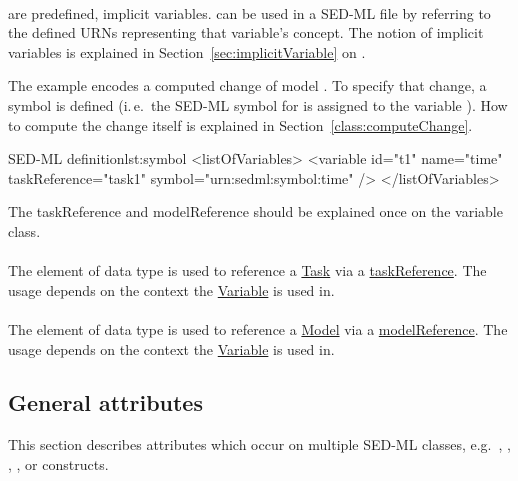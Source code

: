 \paragraph*{}
\label{sec:symbol}
 are predefined, implicit variables.  can be used in a SED-ML file by referring to the defined URNs representing that variable's concept. The notion of implicit variables is explained in Section~\ref{sec:implicitVariable} on .

The example encodes a computed change of model . To specify that change, a symbol is defined (i.\,e.\  the SED-ML symbol for  is assigned to the variable ). How to compute the change itself is explained in Section~\ref{class:computeChange}.

\begin{myXmlLst}{SED-ML  definition}{lst:symbol}
<listOfVariables>
	<variable id="t1" name="time" taskReference="task1" symbol="urn:sedml:symbol:time" />
</listOfVariables>
\end{myXmlLst}

The taskReference and modelReference should be explained once on the variable class.
\paragraph*{}
\label{sec:taskReferenceAttribute}
The  element of data type \hyperref[type:sidref]{} is used to reference a \hyperref[class:task]{Task} via a \hyperref[sec:taskReference]{taskReference}. The usage depends on the context the \hyperref[class:variable]{Variable} is used in.

\paragraph*{}
\label{sec:modelReferenceAttribute}
The  element of data type \hyperref[type:sidref]{} is used to reference a \hyperref[class:model]{Model} via a \hyperref[sec:modelReference]{modelReference}. The usage depends on the context the \hyperref[class:variable]{Variable} is used in.


\subsection{General attributes}
This section describes attributes which occur on multiple SED-ML classes, e.g.\ \hyperref[sec:id]{}, \hyperref[sec:name]{}, \hyperref[sec:math]{}, \hyperref[sec:kisaoid]{}, or \hyperref[sec:listOf]{} constructs.
\label{sec:generalAttributes}

